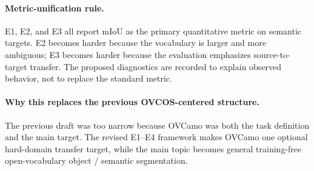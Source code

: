 \documentclass[11pt,a4paper]{article}
\begin{document}
\paragraph{Metric-unification rule.}
E1, E2, and E3 all report mIoU as the primary quantitative metric on semantic targets. E2 becomes harder because the vocabulary is larger and more ambiguous; E3 becomes harder because the evaluation emphasizes source-to-target transfer. The proposed diagnostics are recorded to explain observed behavior, not to replace the standard metric.

\paragraph{Why this replaces the previous OVCOS-centered structure.}
The previous draft was too narrow because OVCamo was both the task definition and the main target. The revised E1--E4 framework makes OVCamo one optional hard-domain transfer target, while the main topic becomes general training-free open-vocabulary object / semantic segmentation.
\end{document}
